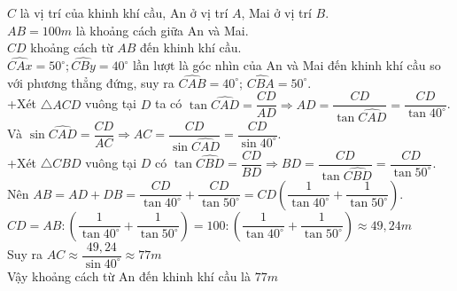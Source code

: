 \begin{ex}
{\begin{center}
\begin{tikzpicture}[line cap=round, line join=round, >=stealth, font=\small, scale=0.55]
	\end{tikzpicture}
	\end{center}
	$C$ là vị trí của khinh khí cầu, An ở vị trí $A$, Mai ở vị trí $B$.\\
	$AB=100m$ là khoảng cách giữa An và Mai.\\
	$CD$ khoảng cách từ $AB$ đến khinh khí cầu.\\
	$\widehat{CAx}=50^\circ;\widehat{CBy}=40^\circ$ lần lượt là góc nhìn của An và Mai đến khinh khí cầu so với phương thẳng đứng, suy ra $\widehat{CAB}=40^\circ$; $\widehat{CBA}=50^\circ$.\\
	+Xét $\triangle ACD$ vuông tại $D$ ta có $\tan \widehat{CAD}=\dfrac{CD}{AD}\Rightarrow AD=\dfrac{CD}{\tan \widehat{CAD}}=\dfrac{CD}{\tan 40^\circ}$.\\
	Và $\sin \widehat{CAD}=\dfrac{CD}{AC}\Rightarrow AC=\dfrac{CD}{\sin \widehat{CAD}}=\dfrac{CD}{\sin 40^\circ}$.\\
	+Xét $\triangle CBD$ vuông tại $D$ có $\tan \widehat{CBD}=\dfrac{CD}{BD}\Rightarrow BD=\dfrac{CD}{\tan \widehat{CBD}}=\dfrac{CD}{\tan 50^\circ}$.\\
	Nên $AB=AD+DB=\dfrac{CD}{\tan 40^\circ}+\dfrac{CD}{\tan 50^\circ}=CD\left(\dfrac{1}{\tan 40^\circ}+\dfrac{1}{\tan 50^\circ}\right)$.\\
	$CD=AB:\left(\dfrac{1}{\tan 40^\circ}+\dfrac{1}{\tan 50^\circ}\right)=100:\left(\dfrac{1}{\tan 40^\circ}+\dfrac{1}{\tan 50^\circ}\right)\approx 49,24m$\\
	Suy ra $AC\approx \dfrac{49,24}{\sin 40^\circ}\approx 77m$\\
	Vậy khoảng cách từ An đến khinh khí cầu là $77m$}
\end{ex}

